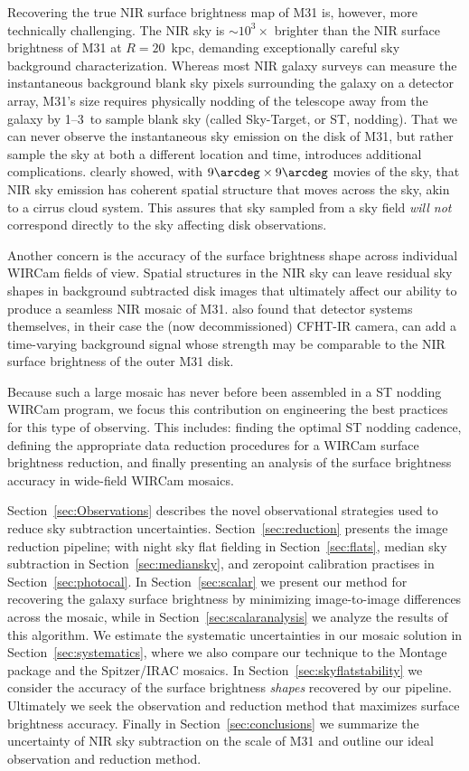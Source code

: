 \documentclass[iop]{emulateapj}
\begin{document}
Recovering the true NIR surface brightness map of M31 is, however, more technically challenging.
The NIR sky is $\sim 10^3\times$ brighter than the NIR surface brightness of M31 at $R=20$~kpc, demanding exceptionally careful sky background characterization.
Whereas most NIR galaxy surveys can measure the instantaneous background blank sky pixels surrounding the galaxy on a detector array, M31's size requires physically nodding of the telescope away from the galaxy by 1\arcdeg--3\arcdeg\ to sample blank sky (called Sky-Target, or ST, nodding).
That we can never observe the instantaneous sky emission on the disk of M31, but rather sample the sky at both a different location and time, introduces additional complications.
\cite{Adams:1996} clearly showed, with $9\arcdeg \times 9\arcdeg$ movies of the sky, that NIR sky emission has coherent spatial structure that moves across the sky, akin to a cirrus cloud system.
This assures that sky sampled from a sky field \emph{will not} correspond directly to the sky affecting disk observations.

Another concern is the accuracy of the surface brightness shape across individual WIRCam fields of view.
Spatial structures in the NIR sky can leave residual sky shapes in background subtracted disk images that ultimately affect our ability to produce a seamless NIR mosaic of M31.
\cite{Vaduvescu:2004} also found that detector systems themselves, in their case the (now decommissioned) CFHT-IR camera, can add a time-varying background signal whose strength may be comparable to the NIR surface brightness of the outer M31 disk.

Because such a large mosaic has never before been assembled in a ST nodding WIRCam program, we focus this contribution on engineering the best practices for this type of observing.
This includes: finding the optimal ST nodding cadence, defining the appropriate data reduction procedures for a WIRCam surface brightness reduction, and finally presenting an analysis of the surface brightness accuracy in wide-field WIRCam mosaics.

Section~\ref{sec:Observations} describes the novel observational strategies used to reduce sky subtraction uncertainties.
Section~\ref{sec:reduction} presents the image reduction pipeline; with night sky flat fielding in Section~\ref{sec:flats}, median sky subtraction in Section~\ref{sec:mediansky}, and zeropoint calibration practises in Section~\ref{sec:photocal}.
In Section~\ref{sec:scalar} we present our method for recovering the galaxy surface brightness by minimizing image-to-image differences across the mosaic, while in Section~\ref{sec:scalaranalysis} we analyze the results of this algorithm.
We estimate the systematic uncertainties in our mosaic solution in Section~\ref{sec:systematics}, where we also compare our technique to the Montage package \citep{Berriman:2008} and the Spitzer/IRAC mosaics.
In Section~\ref{sec:skyflatstability} we consider the accuracy of the surface brightness \emph{shapes} recovered by our pipeline.
Ultimately we seek the observation and reduction method that maximizes surface brightness accuracy.
Finally in Section~\ref{sec:conclusions} we summarize the uncertainty of NIR sky subtraction on the scale of M31 and outline our ideal observation and reduction method.
\end{document}
